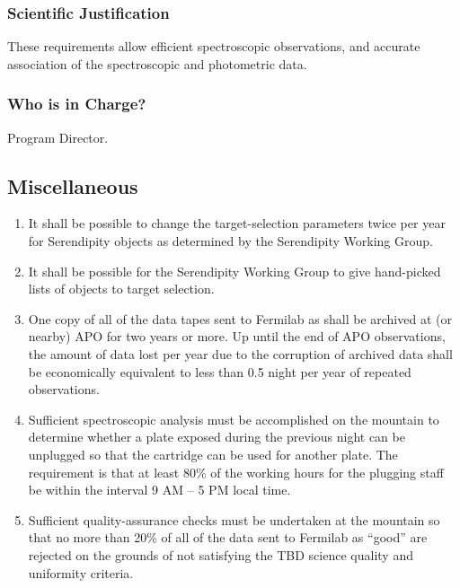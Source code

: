 \subsubsection{Scientific Justification}
These requirements allow efficient spectroscopic observations, and
accurate association of the spectroscopic and photometric data. 

\subsubsection{Who is in Charge?}

Program Director. 


\subsection{Miscellaneous}

\begin{enumerate} 
\item It shall be possible to change the target-selection parameters twice per year 
for Serendipity objects as determined by the Serendipity Working
Group. 

\item It shall be possible for the Serendipity Working Group to give
hand-picked lists of objects to target selection. 

\item One copy of all of the data tapes sent 
to Fermilab as shall be archived at (or nearby) APO for two years or
more.  Up until the  
end of APO observations, the amount of data lost per year due to the 
corruption of archived data shall be economically equivalent to 
less than 0.5 night per year of repeated observations. 

\item Sufficient spectroscopic analysis must be accomplished on 
the mountain to determine whether a plate exposed during the 
previous night can be unplugged so that the cartridge can be used 
for another plate.  The requirement is that at least 80\% of the working
hours for the plugging staff be within the interval 9 AM -- 5 PM local 
time.

\item Sufficient quality-assurance checks must be undertaken at 
the mountain so that no more than 20\% of all of the data sent to 
Fermilab as ``good'' are rejected on the grounds of not satisfying the
TBD science quality and uniformity criteria. 

\end{enumerate}

